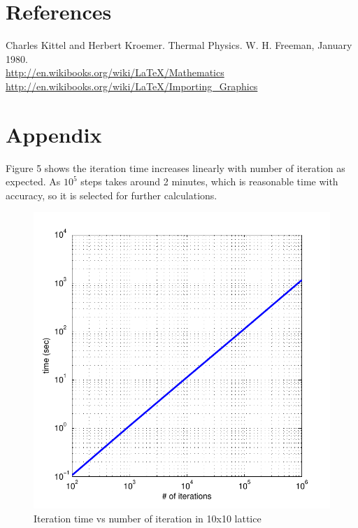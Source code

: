 \documentclass[]{article}
\begin{document}
\section*{References}
Charles Kittel and Herbert Kroemer. Thermal Physics. W. H. Freeman, January 1980. 
\\
\url{http://en.wikibooks.org/wiki/LaTeX/Mathematics}
\\
\url{http://en.wikibooks.org/wiki/LaTeX/Importing_Graphics}
\\
\appendix
\section*{Appendix}
Figure 5 shows the iteration time increases linearly with number of iteration as expected. As $10^5$ steps takes around 2 minutes, which is reasonable time with accuracy, so it is selected for further calculations.
\begin{figure}[p]
  \centering
  \includegraphics[scale=0.6]{figures/fig_7}%
  \caption{\label{fig:epsart} Iteration time vs number of iteration in 10x10 lattice}
\end{figure}
\end{document}

